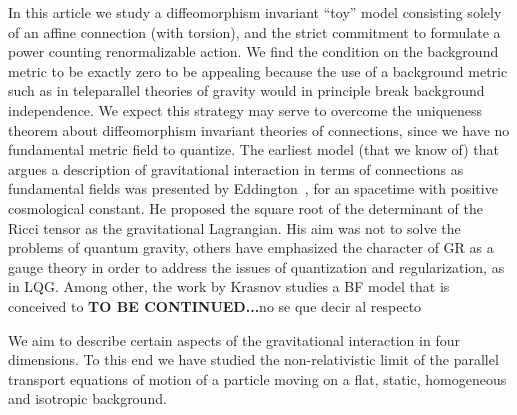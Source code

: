 \documentclass[twocolumn,
  showpacs,showkeys,prd,superscriptaddress]{revtex4-1}
\begin{document}
In this article we study a diffeomorphism invariant ``toy'' model  consisting  solely of an affine connection  (with torsion), and the strict commitment to formulate a power counting renormalizable action.  We find the condition on the background metric to be exactly zero to be appealing because the use of a background metric such as in teleparallel theories of gravity would in principle break background independence. We expect  this strategy may serve to overcome  the uniqueness theorem about diffeomorphism invariant theories of connections, since we  have no fundamental metric field to quantize. The earliest model (that we know of) that argues  a description of gravitational interaction in terms of connections as fundamental fields  was presented by Eddington~\cite{Eddington1923math}, for an spacetime with positive cosmological constant. He proposed the square root of the determinant of the Ricci tensor as the gravitational Lagrangian. His aim was not to solve the problems of quantum gravity,  others have emphasized the character of GR as a gauge theory in order to address the issues of quantization and regularization, as in LQG. Among other, the work by  Krasnov studies a BF model that is conceived to {\bfseries \color{blue} TO BE CONTINUED...}{\color{red}no se que decir al respecto}

We aim to describe certain aspects of the gravitational interaction in four dimensions. To this end we have studied the non-relativistic limit of the parallel transport equations of motion of a particle moving on a flat, static, homogeneous and isotropic background.





\end{document}
